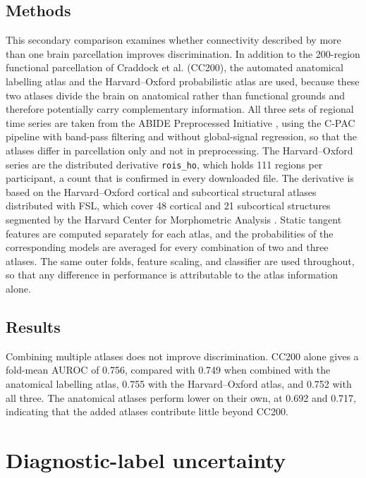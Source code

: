 \documentclass[a4paper,fleqn]{cas-sc}
\begin{document}
\subsection{Methods}
This secondary comparison examines whether connectivity described by more than one brain parcellation improves discrimination. In addition to the 200-region functional parcellation of Craddock et al. (CC200), the automated anatomical labelling atlas \citep{TzourioMazoyeretal2002} and the Harvard--Oxford probabilistic atlas are used, because these two atlases divide the brain on anatomical rather than functional grounds and therefore potentially carry complementary information. All three sets of regional time series are taken from the ABIDE Preprocessed Initiative \citep{Craddocketal2013,ABIDE_preprocessed_dataset}, using the C-PAC pipeline with band-pass filtering and without global-signal regression, so that the atlases differ in parcellation only and not in preprocessing. The Harvard--Oxford series are the distributed derivative \texttt{rois\_ho}, which holds 111 regions per participant, a count that is confirmed in every downloaded file. The derivative is based on the Harvard--Oxford cortical and subcortical structural atlases distributed with FSL, which cover 48 cortical and 21 subcortical structures segmented by the Harvard Center for Morphometric Analysis \citep{Makrisetal2006,Frazieretal2005,Desikanetal2006,Goldsteinetal2007}. Static tangent features are computed separately for each atlas, and the probabilities of the corresponding models are averaged for every combination of two and three atlases. The same outer folds, feature scaling, and classifier are used throughout, so that any difference in performance is attributable to the atlas information alone.

\subsection{Results}
Combining multiple atlases does not improve discrimination. CC200 alone gives a fold-mean AUROC of 0.756, compared with 0.749 when combined with the anatomical labelling atlas, 0.755 with the Harvard--Oxford atlas, and 0.752 with all three. The anatomical atlases perform lower on their own, at 0.692 and 0.717, indicating that the added atlases contribute little beyond CC200.

\section{Diagnostic-label uncertainty}
\label{sec:supp-label-noise}
\end{document}
